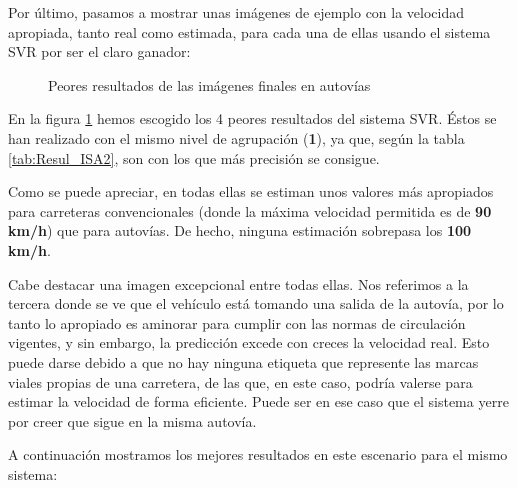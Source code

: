 Por último, pasamos a mostrar unas imágenes de ejemplo con la velocidad apropiada, tanto real como estimada, para cada una de ellas usando el sistema \ac{SVR} por ser el claro ganador:

\begin{figure}[H]
\centering
  \begin{subfigure}[b]{0.45\linewidth}
  \end{subfigure}
  \begin{subfigure}[b]{0.45\linewidth}
  \end{subfigure}
  \begin{subfigure}[b]{0.45\linewidth}
  \end{subfigure}
  \begin{subfigure}[b]{0.45\linewidth}
  \end{subfigure}
  \caption{Peores resultados de las imágenes finales en autovías}  
  \label{fig:SVR_Autovia_MAL}
\end{figure}

En la figura \ref{fig:SVR_Autovia_MAL} hemos escogido los 4 peores resultados del sistema \ac{SVR}. Éstos se han realizado con el mismo nivel de agrupación (\textbf{1}), ya que, según la tabla \ref{tab:Resul_ISA2}, son con los que más precisión se consigue.

Como se puede apreciar, en todas ellas se estiman unos valores más apropiados para carreteras convencionales (donde la máxima velocidad permitida es de \textbf{90 km/h}) que para autovías. De hecho, ninguna estimación sobrepasa los \textbf{100 km/h}.

Cabe destacar una imagen excepcional entre todas ellas. Nos referimos a la tercera donde se ve que el vehículo está tomando una salida de la autovía, por lo tanto lo apropiado es aminorar para cumplir con las normas de circulación vigentes, y sin embargo, la predicción excede con creces la velocidad real. Esto puede darse debido a que no hay ninguna etiqueta que represente las marcas viales propias de una carretera, de las que, en este caso, podría valerse para estimar la velocidad de forma eficiente. Puede ser en ese caso que el sistema yerre por creer que sigue en la misma autovía.

A continuación mostramos los mejores resultados en este escenario para el mismo sistema:

